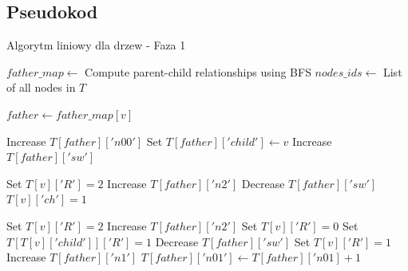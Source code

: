 \subsection{Pseudokod}
\begin{algorithm}
    \caption*{Algorytm liniowy dla drzew - Faza 1}
    \begin{algorithmic}[1]
            \State $father\_map \gets$ Compute parent-child relationships using BFS
            \State $nodes\_ids \gets$ List of all nodes in $T$
    
                \State $father \gets father\_map[v]$
    
                    \State Increase $T[father]['n00']$
                    \State Set $T[father]['child'] \gets v$
                \Else
                        \State Increase $T[father]['sw']$
                    \EndIf
    
                        \State Set $T[v]['R'] = 2$
                            \State Increase $T[father]['n2']$
                                \State Decrease $T[father]['sw']$
                            \EndIf
                        \EndIf
                        \State $T[v]['ch'] = 1$
                    \EndIf
    
                            \State Set $T[v]['R'] = 2$
                                \State Increase $T[father]['n2']$
                            \EndIf
                            \State Set $T[v]['R'] = 0$
                            \State Set $T[T[v]['child']]['R'] = 1$
                                \State Decrease $T[father]['sw']$
                            \EndIf
                        \EndIf
                        \State Set $T[v]['R'] = 1$
                            \State Increase $T[father]['n1']$
                        \EndIf
                    \EndIf
                    \EndIf
                        \State $T[father]['n01'] \gets T[father]['n01] + 1$
                    \EndIf


\end{algorithmic}
\end{algorithm}
